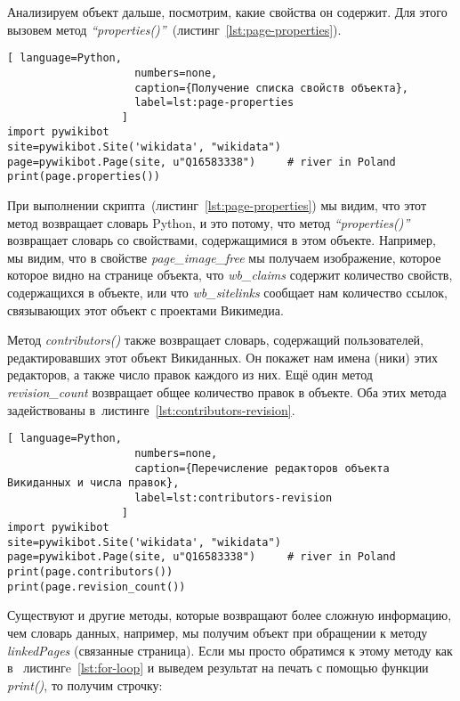 Анализируем объект дальше, посмотрим, какие свойства он содержит. Для этого вызовем метод \textit{``properties()''}~(листинг~\ref{lst:page-properties}).

\begin{lstlisting}[ language=Python,
                    numbers=none,
                    caption={Получение списка свойств объекта},
                    label=lst:page-properties
                  ]
import pywikibot
site=pywikibot.Site('wikidata', "wikidata")
page=pywikibot.Page(site, u"Q16583338")     # river in Poland
print(page.properties())
\end{lstlisting}

При выполнении скрипта~(листинг~\ref{lst:page-properties}) мы видим, что этот метод возвращает словарь Python, и это потому, что метод \textit{``properties()''} возвращает словарь со свойствами, содержащимися в этом объекте. Например, мы видим, что в свойстве \textit{page\_image\_free} мы получаем изображение, которое которое видно на странице объекта, что \textit{wb\_claims} содержит количество свойств, содержащихся в объекте, или что \textit{wb\_sitelinks} сообщает нам количество ссылок, связывающих этот объект с проектами Викимедиа.

Метод \textit{contributors()} также возвращает словарь, содержащий пользователей, редактировавших этот объект Викиданных. Он покажет нам имена (ники) этих редакторов, а также число правок каждого из них. Ещё один метод \textit{revision\_count} возвращает общее количество правок в объекте. Оба этих метода задействованы в~листинге~\ref{lst:contributors-revision}.

\begin{lstlisting}[ language=Python,
                    numbers=none,
                    caption={Перечисление редакторов объекта Викиданных и числа правок},
                    label=lst:contributors-revision
                  ]
import pywikibot
site=pywikibot.Site('wikidata', "wikidata")
page=pywikibot.Page(site, u"Q16583338")     # river in Poland
print(page.contributors())
print(page.revision_count())
\end{lstlisting}

Существуют и другие методы, которые возвращают более сложную информацию, чем словарь данных, например, мы получим объект при обращении к методу \textit{linkedPages} (связанные страница). Если мы просто обратимся к этому методу как в ~листингe~\ref{lst:for-loop} и выведем результат на печать с помощью функции \textit{print()}, то получим строчку: 


